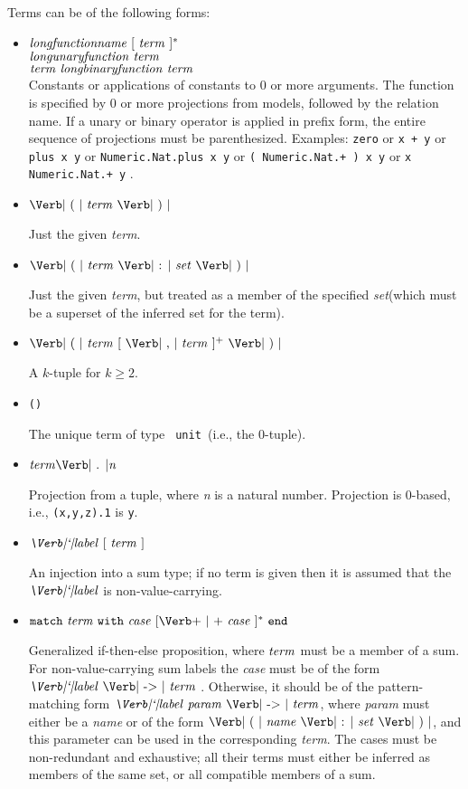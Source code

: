 \documentclass[11pt]{article}
\newcommand{\keywd}[1]{\mbox{\texttt{#1}}\xspace}
\newcommand{\END}{\keywd{end}}
\newcommand{\MATCH}{\keywd{match}}
\newcommand{\UNIT}{\mbox{\Verb| unit |}}
\newcommand{\WITH}{\keywd{with}}
\newcommand{\metav}[1]{\mbox{\textit{#1}}\xspace}
\newcommand{\Case}{\metav{case}}
\newcommand{\Ident}{\metav{name}}
\newcommand{\Identifier}{\Ident}
\newcommand{\Label}{\metav{\Verb|`|label}}
\newcommand{\Setexp}{\metav{set}}
\newcommand{\Param}{\metav{param}}
\newcommand{\Term}{\metav{term}}
\newcommand{\ARROW}{\mbox{\Verb| -> |}}
\newcommand{\BAR}{\mbox{\Verb+ | +}}
\newcommand{\COLON}{\mbox{\Verb| : |}}
\newcommand{\COMMA}{\mbox{\Verb| , |}}
\newcommand{\LPAREN}{\mbox{\Verb| ( |}}
\newcommand{\RPAREN}{\mbox{\Verb| ) |}}
\newcommand{\PERIOD}{\mbox{\Verb| . |}}
\begin{document}
Terms can be of the following forms:
\begin{itemize}
\item $\metav{longfunctionname}\ [\ \Term\ ]^*$\\
      $\metav{longunaryfunction}\ \Term$\\
      $\Term\ \metav{longbinaryfunction}\ \Term$\\
  
  Constants or applications of constants to 0 or more arguments.  The
  function is specified by 0 or more projections from models, followed
  by the relation name.  If a unary or binary operator is applied in
  prefix form, the entire sequence of projections must be
  parenthesized.  Examples: \Verb|zero| or \Verb|x + y| or 
 \Verb|plus x y| or \Verb|Numeric.Nat.plus x y| or \Verb|( Numeric.Nat.+ ) x y|
  or \Verb|x Numeric.Nat.+ y| .

\item $\LPAREN\ \Term\ \RPAREN$

  Just the given \Term.

\item $\LPAREN\ \Term\ \COLON\ \Setexp\ \RPAREN$

  Just the given \Term, but treated as a member of the specified
  \Setexp (which must be a superset of the inferred set for the term).

\item $\LPAREN\ \Term\ [\ \COMMA\ \Term\ ]^{+}\ \RPAREN$

  A $k$-tuple for $k\ge 2$.

\item \Verb|()|

  The unique term of type \UNIT (i.e., the 0-tuple).

\item $\Term \PERIOD \metav{n}$
 
  Projection from a tuple, where \metav{n} is a natural number.  Projection
  is 0-based, i.e., \Verb|(x,y,z).1| is \Verb|y|.

\item $\Label\ [\ \Term\ ]$

  An injection into a sum type; if no term is given then it is
  assumed that the $\Label$ is non-value-carrying.

\item $\MATCH\ \Term\ \WITH\ \Case\ [\BAR\ \Case\ ]^*\ \END$
  
  Generalized if-then-else proposition, where
  $\Term$ must be a member of a sum.  For non-value-carrying
  sum labels the \Case must be of the form  $\Label\ \ARROW\
  \Term$ .  Otherwise, it should be of the pattern-matching
  form $\Label\ \Param\ \ARROW\ \Term$, where \Param must
  either be a \Ident or of the form $\LPAREN\ \Identifier\ \COLON\ 
  \Setexp\ \RPAREN$, and this parameter can be used in the
  corresponding \Term.  The cases must be non-redundant
  and exhaustive; all their terms must either be inferred
  as members of the same set, or all compatible members
  of a sum.
  

\end{itemize}
\end{document}

